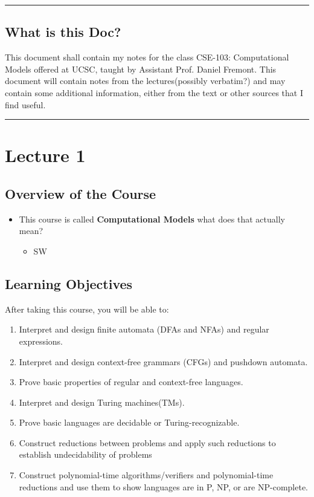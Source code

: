 \documentclass{article}
\begin{document}
\begin{center}
	\rule{450pt}{1pt} 
\end{center}

\subsection*{What is this Doc?}
This document shall contain my notes for the class CSE-103: Computational Models offered at UCSC, taught by Assistant Prof. Daniel Fremont. This document will contain notes from the lectures(possibly verbatim?) and may contain some additional information, either from the text or other sources that I find useful.


\begin{center}
	\rule{450pt}{3pt} 
\end{center}
\newpage



\section*{Lecture 1}

\subsection*{Overview of the Course}
\begin{itemize}
    \item This course is called \textbf{Computational Models} what does that actually mean?
    \begin{itemize}[label=\textbullet]
        \item SW    
    \end{itemize}
\end{itemize}



\subsection*{Learning Objectives}
After taking this course, you will be able to:
\begin{enumerate}
    \item Interpret and design finite automata (DFAs and NFAs) and regular expressions.
    \item Interpret and design context-free grammars (CFGs) and pushdown automata.
    \item Prove basic properties of regular and context-free languages.
    \item Interpret and design Turing machines(TMs).
    \item Prove basic languages are decidable or Turing-recognizable.
    \item Construct reductions between problems and apply such reductions to establish undecidability of problems
    \item Construct polynomial-time algorithms/verifiers and polynomial-time reductions and use them to show languages are in P, NP, or are NP-complete.
\end{enumerate}
\end{document}

